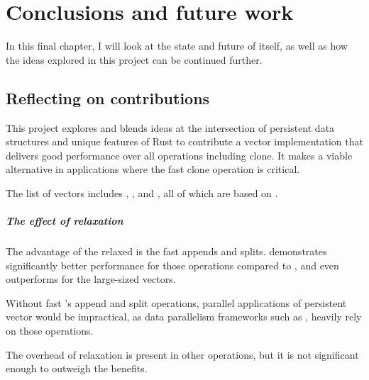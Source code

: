 \chapter{Conclusions and future work}
In this final chapter, I will look at the state and future of \pvecrs{} itself, as well as how the ideas explored in this project can be continued further.

\section{Reflecting on contributions}


This project explores and blends ideas at the intersection of persistent data structures and unique features of Rust to contribute a vector implementation that delivers good performance over all operations including clone. It makes \pvecrs{} a viable alternative in applications where the fast clone operation is critical. 

The list of vectors includes \rbvec{}, \rrbvec{}, and \pvec{}, all of which are based on \rrbtree{}. 


\paragraph{The effect of relaxation}
The advantage of the relaxed \rbtree{} is the fast appends and splits. \rrbvec{} demonstrates significantly better performance for those operations compared to \rbvec{}, and even outperforms \stdvec{} for the large-sized vectors. 

Without fast \rrbvec{}'s append and split operations, parallel applications of persistent vector would be impractical, as data parallelism frameworks such as \rayon{}, heavily rely on those operations. 

The overhead of relaxation is present in other operations, but it is not significant enough to outweigh the benefits. 



